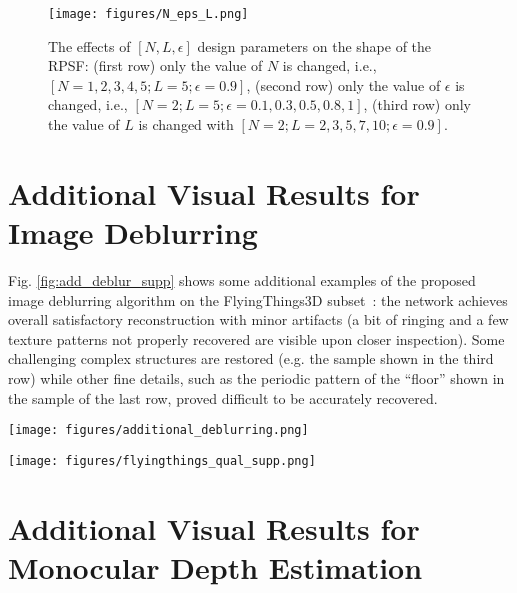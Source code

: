 \documentclass[preprint,5p,twocolumn]{elsarticle}
\begin{document}
 \begin{figure}[h!]
 \centering
 \texttt{[image: figures/N\_eps\_L.png]}
 \caption{The effects of $[N,L,\epsilon]$  design parameters on the shape of the RPSF: (first row) only the value of $N$ is changed, i.e., $[N=1,2,3,4,5;L=5;\epsilon=0.9]$, (second row) only the value of $\epsilon$ is changed, i.e., $[N=2; L=5; \epsilon = 0.1,0.3,0.5,0.8,1]$, (third row) only the value of $L$ is changed with $[N=2; L=2,3,5,7,10; \epsilon=0.9]$. }
 \label{fig:N_eps_L}
\end{figure}

\section{Additional Visual Results for Image Deblurring}
\label{sec:res1}




Fig. \ref{fig:add_deblur_supp} shows some additional examples of the proposed image deblurring algorithm on   the FlyingThings3D subset~\cite{MIFDB16}: the network achieves overall satisfactory reconstruction with minor artifacts (a bit of ringing and a few texture patterns not properly recovered are visible upon closer inspection). Some challenging complex structures are restored (e.g. the sample shown in the third row) while other fine details, such as the periodic pattern of the ``floor'' shown in the sample of the last row, proved difficult  to be accurately recovered.

\begin{figure*}[h!]
\centering
\texttt{[image: figures/additional\_deblurring.png]}
\caption{Additional qualitative results of the image deblurring model on the test set of FlyingThings3D~\cite{MIFDB16} subset.}
\label{fig:add_deblur_supp}
\end{figure*}



\begin{figure*}[h!]
\centering
\captionsetup{justification=centering}
\texttt{[image: figures/flyingthings\_qual\_supp.png]}
\caption{Additional qualitative results on RPSF-blurred images from the test set of FlyingThings3D~\cite{MIFDB16} subset.}
\label{fig:supp_ft}
\end{figure*}

\section{Additional Visual Results for Monocular Depth Estimation}
\label{sec:res2}
\end{document}
